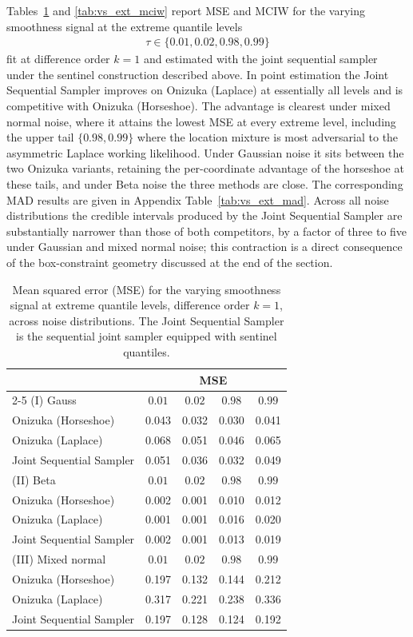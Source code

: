 Tables~\ref{tab:vs_ext_mse} and \ref{tab:vs_ext_mciw} report MSE and MCIW for the varying smoothness signal at the extreme quantile levels
\begin{align*}
	\tau \in \{0.01, 0.02, 0.98, 0.99\}
\end{align*}
fit at difference order $k = 1$ and estimated with the joint sequential sampler under the sentinel construction described above. In point estimation the Joint Sequential Sampler improves on Onizuka (Laplace) at essentially all levels and is competitive with Onizuka (Horseshoe). The advantage is clearest under mixed normal noise, where it attains the lowest MSE at every extreme level, including the upper tail $\{0.98, 0.99\}$ where the location mixture is most adversarial to the asymmetric Laplace working likelihood. Under Gaussian noise it sits between the two Onizuka variants, retaining the per-coordinate advantage of the horseshoe at these tails, and under Beta noise the three methods are close. The corresponding MAD results are given in Appendix Table~\ref{tab:vs_ext_mad}. Across all noise distributions the credible intervals produced by the Joint Sequential Sampler are substantially narrower than those of both competitors, by a factor of three to five under Gaussian and mixed normal noise; this contraction is a direct consequence of the box-constraint geometry discussed at the end of the section.

\begin{table}[htbp]
\centering
\caption{Mean squared error (MSE) for the varying smoothness signal at extreme quantile levels, difference order $k = 1$, across noise distributions. The Joint Sequential Sampler is the sequential joint sampler equipped with sentinel quantiles.}
\label{tab:vs_ext_mse}
\begin{tabular}{lcccc}
\toprule
& \multicolumn{4}{c}{MSE} \\
\cmidrule(lr){2-5}
(I) Gauss & $0.01$ & $0.02$ & $0.98$ & $0.99$ \\
\midrule
Onizuka (Horseshoe)      & 0.043 & 0.032 & 0.030 & 0.041 \\
Onizuka (Laplace)        & 0.068 & 0.051 & 0.046 & 0.065 \\
Joint Sequential Sampler & 0.051 & 0.036 & 0.032 & 0.049 \\
\midrule
(II) Beta & $0.01$ & $0.02$ & $0.98$ & $0.99$ \\
\midrule
Onizuka (Horseshoe)      & 0.002 & 0.001 & 0.010 & 0.012 \\
Onizuka (Laplace)        & 0.001 & 0.001 & 0.016 & 0.020 \\
Joint Sequential Sampler & 0.002 & 0.001 & 0.013 & 0.019 \\
\midrule
(III) Mixed normal & $0.01$ & $0.02$ & $0.98$ & $0.99$ \\
\midrule
Onizuka (Horseshoe)      & 0.197 & 0.132 & 0.144 & 0.212 \\
Onizuka (Laplace)        & 0.317 & 0.221 & 0.238 & 0.336 \\
Joint Sequential Sampler & 0.197 & 0.128 & 0.124 & 0.192 \\
\bottomrule
\end{tabular}
\end{table}

